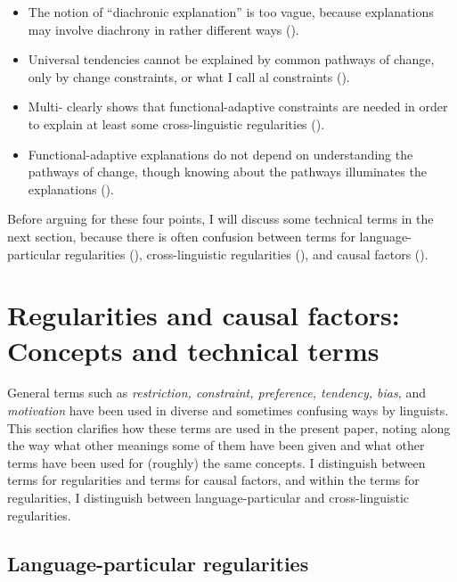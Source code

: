 \documentclass[output=paper]{langsci/langscibook}
\begin{document}
\begin{itemize}
\item The notion of “diachronic explanation” is too vague, because explanations may involve diachrony in rather different ways ().
\item Universal tendencies cannot be explained by common pathways of change, only by change constraints, or what I call al constraints ().
\item Multi- clearly shows that functional-adaptive constraints are needed in order to explain at least some cross-linguistic regularities ().
\item Functional-adaptive explanations do not depend on understanding the pathways of change, though knowing about the pathways illuminates the explanations ().
\end{itemize}

Before arguing for these four points, I will discuss some technical terms in the next section, because there is often confusion between terms for language-particular regularities (), cross-linguistic regularities (), and causal factors ().

\section{Regularities and causal factors: Concepts and technical terms}\label{sec:haspelmath:2}

General terms such as \textit{restriction, constraint, preference, tendency, bias,} and \textit{motivation} have been used in diverse and sometimes confusing ways by linguists. This section clarifies how these terms are used in the present paper, noting along the way what other meanings some of them have been given and what other terms have been used for (roughly) the same concepts. I distinguish between terms for regularities and terms for causal factors, and within the terms for regularities, I distinguish between language-particular and cross-linguistic regularities.

\subsection{Language-particular regularities}\label{sec:haspelmath:2.1}
\end{document}
